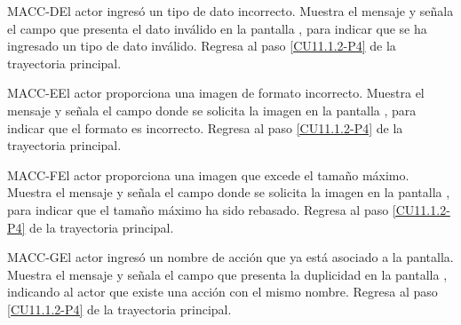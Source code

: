 \begin{UCtrayectoriaA}{MACC-D}{El actor ingresó un tipo de dato incorrecto.}
	\UCpaso[\UCsist] Muestra el mensaje  y señala el campo que presenta el dato inválido en la pantalla , para indicar que se ha ingresado un tipo de dato inválido.
	\UCpaso Regresa al paso \ref{CU11.1.2-P4} de la trayectoria principal.
\end{UCtrayectoriaA}

\begin{UCtrayectoriaA}{MACC-E}{El actor proporciona una imagen de formato incorrecto.}
	\UCpaso[\UCsist] Muestra el mensaje  y señala el campo donde se solicita la imagen en la pantalla , para indicar que el formato es incorrecto.
	\UCpaso Regresa al paso \ref{CU11.1.2-P4} de la trayectoria principal.
\end{UCtrayectoriaA}

\begin{UCtrayectoriaA}{MACC-F}{El actor proporciona una imagen que excede el tamaño máximo.}
	\UCpaso[\UCsist] Muestra el mensaje  y señala el campo donde se solicita la imagen en la pantalla , para indicar que el tamaño máximo ha sido rebasado.
	\UCpaso Regresa al paso \ref{CU11.1.2-P4} de la trayectoria principal.
\end{UCtrayectoriaA}

\begin{UCtrayectoriaA}{MACC-G}{El actor ingresó un nombre de acción que ya está asociado a la pantalla.}
	\UCpaso[\UCsist] Muestra el mensaje  y señala el campo que presenta la duplicidad en la pantalla , indicando al actor que existe una acción con el mismo nombre.
	\UCpaso Regresa al paso \ref{CU11.1.2-P4} de la trayectoria principal.
\end{UCtrayectoriaA}
